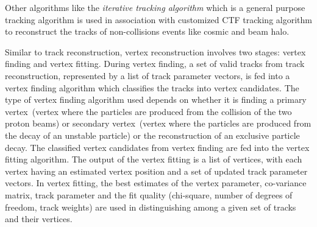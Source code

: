 Other algorithms like the \textit{iterative tracking algorithm} which is a general purpose tracking algorithm is used in association with customized CTF tracking algorithm to reconstruct the tracks of non-collisions  events like cosmic and beam halo.
\par 
Similar to track reconstruction, vertex reconstruction involves two stages: vertex finding and vertex fitting. During vertex finding, a set of valid tracks from track reconstruction, represented by a list of track parameter vectors, is fed into a vertex finding algorithm which classifies the tracks into vertex candidates. The type of vertex finding algorithm used depends on whether it is finding a primary vertex~(vertex where the particles are produced from the collision of the two proton beams) or secondary vertex~(vertex where the particles are produced from the decay of an unstable particle) or the reconstruction of an exclusive particle decay. 
\newline
The classified vertex candidates from vertex finding are fed into the vertex fitting algorithm. The output of the vertex fitting is a list of vertices, with each vertex having an estimated vertex position and a set of updated track parameter vectors. In vertex fitting, the best estimates of the vertex parameter, co-variance matrix, track parameter and the fit quality (chi-square, number of degrees of freedom, track weights) are used in distinguishing among a given set of tracks and their vertices.


